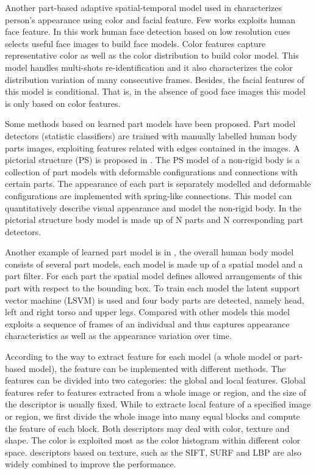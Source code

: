 \indent Another part-based adaptive spatial-temporal model used in \cite{PartbasedSTReid} characterizes person's appearance using color and facial feature. Few works exploits human face feature. In this work human face detection based on low resolution cues selects useful face images to build face models. Color features capture representative color as well as the color distribution to build color model. This model handles multi-shots re-identification and it also characterizes the color distribution variation of many consecutive frames.  Besides, the facial features of this model is conditional. That is, in the absence of good face images this model is only based on color features.

Some methods based on learned part models have been proposed. Part model detectors (statistic classifiers) are trained with manually labelled human body parts images, exploiting features related with edges contained in the images. A pictorial structure (PS) is proposed in \cite{PictorialModel}. The PS model of a non-rigid body is a collection of part models with deformable configurations and connections with certain parts. The appearance of each part is separately modelled and deformable configurations are implemented with spring-like connections. This model can quantitatively describe visual appearance and model the non-rigid body. In \cite{PSmodelRevisit} the pictorial structure body model is made up of N parts and N corresponding part detectors. 

Another example of learned part model is in \cite{MultiPersonREID, PartbasedSTReid}, the overall human body model consists of several part models, each model is made up of a spatial model and a part filter. For each part the spatial model defines allowed arrangements of this part with respect to the bounding box. To train each model the latent support vector machine (LSVM) is used and four body parts are detected, namely head, left and right torso and upper legs. Compared with other models this model exploits a sequence of frames of an individual and thus captures appearance characteristics as well as the appearance variation over time.

According to the way to extract feature for each model (a whole model or part-based model), the feature can be implemented with different methods. The features can be divided into two categories: the global and local features. Global features refer to features extracted from a whole image or region, and the size of the descriptor is usually fixed. While to extracte local feature of a specified image or region, we first divide the whole image into many equal blocks and compute the feature of each block.  Both descriptors may deal with color, texture and shape. The color is exploited most as the color histogram within different color space. descriptors based on texture, such as the SIFT, SURF and LBP are also widely combined to improve the performance.


